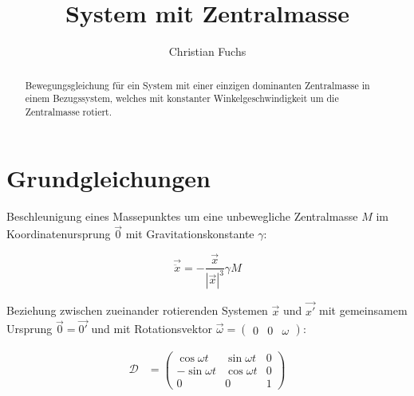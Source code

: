 \documentclass[12pt]{article}
\title{System mit Zentralmasse}
\author{Christian Fuchs}
\begin{document}
\maketitle

\begin{abstract}
Bewegungsgleichung für ein System mit einer einzigen dominanten Zentralmasse in einem Bezugssystem, welches mit konstanter Winkelgeschwindigkeit um die Zentralmasse rotiert.
\end{abstract}

\tableofcontents

\section{Grundgleichungen}

Beschleunigung eines Massepunktes um eine unbewegliche Zentralmasse $M$ im Koordinatenursprung $\vec{0}$ mit Gravitationskonstante $\gamma$:

\begin{equation}
\vec{\ddot{x}} = - \frac{\vec{x}}{\left| \vec{x} \right|^3} \gamma M
\end{equation}

Beziehung zwischen zueinander rotierenden Systemen $\vec{x}$ und $\vec{x'}$ mit gemeinsamem Ursprung $\vec{0} = \vec{0'}$ und mit Rotationsvektor $\vec{\omega} = \left( \begin{matrix} 0 & 0 & \omega \end{matrix} \right)$:

\begin{eqnarray}
\mathcal{D} &= \left(
\begin{matrix}
  \cos \omega t & \sin \omega t & 0 \\
 -\sin \omega t & \cos \omega t & 0 \\
  0             & 0             & 1
\end{matrix}
\right)
\end{eqnarray}
\end{document}
